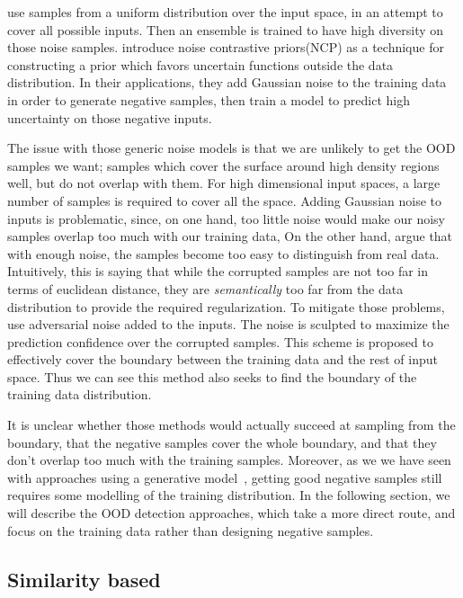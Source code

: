 \documentclass[../main.tex]{subfiles}
\begin{document}
\cite{jain2019maximizing} use samples from a uniform distribution over the input space, in an attempt to cover all possible inputs. Then an ensemble is trained to have high diversity on those noise samples. \citet{Hafner2018NoiseCP} introduce noise contrastive priors(NCP) as a technique for constructing a prior which favors uncertain functions outside the data distribution. In their applications, they add Gaussian noise to the training data in order to generate negative samples, then train a model to predict high uncertainty on those negative inputs.

The issue with those generic noise models is that we are unlikely to get the OOD samples we want; samples which cover the surface around high density regions well, but do not overlap with them. For high dimensional input spaces, a large number of samples is required to cover all the space. Adding Gaussian noise to inputs is problematic, since, on one hand, too little noise would make our noisy samples overlap too much with our training data, On the other hand, \cite{csiszarik2019negative} argue that with enough noise, the samples become too easy to distinguish from real data. Intuitively, this is saying that while the corrupted samples are not too far in terms of euclidean distance, they are \emph{semantically} too far from the data distribution to provide the required regularization. To mitigate those problems, \cite{hein2019relu} use adversarial noise added to the inputs. The noise is sculpted to maximize the prediction confidence over the corrupted samples. This scheme is proposed to effectively cover the boundary between the training data and the rest of input space. Thus we can see  this method also seeks to find the boundary of the training data distribution.

It is unclear whether those methods would actually succeed at sampling from the boundary, that the negative samples cover the whole boundary, and that they don't overlap too much with the training samples. 
Moreover, as we we have seen with approaches using a generative model~\citep{vernekar, lee2017training}, getting good negative samples still requires some modelling of the training distribution. In the following section, we will describe the OOD detection approaches, which take a more direct route, and focus on the training data rather than designing negative samples.


\subsection{Similarity based}
\end{document}
